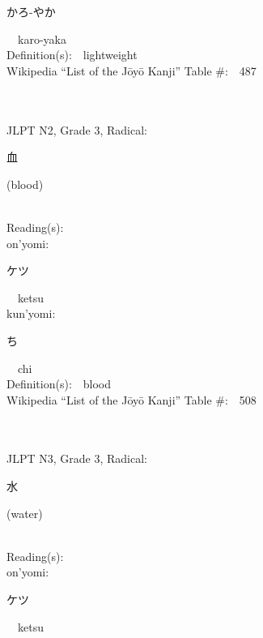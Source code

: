 \begin{multicols}{2}
{\hspace*{2em}}{\begin{CJK}{UTF8}{min} かろ-やか \end{CJK}}\ \ karo-yaka\ \ \\
Definition(s):\ \ lightweight \\
Wikipedia ``List of the J\=oy\=o Kanji'' Table \#:\ \ 487 \\
\ \ \\
{\fontsize{34pt}{40pt}  }\ \ \\  %
{JLPT N2, Grade 3, Radical:\ \ {\begin{CJK}{UTF8}{min} 血 \end{CJK}} (blood) } \\
Reading(s):\ \ \\
{\hspace*{1em}}on'yomi:\ \ \\
{\hspace*{2em}}{\begin{CJK}{UTF8}{min} ケツ \end{CJK}}\ \ ketsu\ \ \\
{\hspace*{1em}}kun'yomi:\ \ \\
{\hspace*{2em}}{\begin{CJK}{UTF8}{min} ち \end{CJK}}\ \ chi\ \ \\
Definition(s):\ \ blood \\
Wikipedia ``List of the J\=oy\=o Kanji'' Table \#:\ \ 508 \\
\ \ \\
{\fontsize{34pt}{40pt}  }\ \ \\  %
{JLPT N3, Grade 3, Radical:\ \ {\begin{CJK}{UTF8}{min} 水 \end{CJK}} (water) } \\
Reading(s):\ \ \\
{\hspace*{1em}}on'yomi:\ \ \\
{\hspace*{2em}}{\begin{CJK}{UTF8}{min} ケツ \end{CJK}}\ \ ketsu\ \ \\

\end{multicols}
